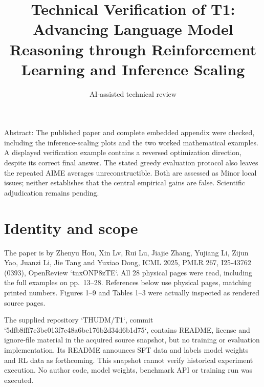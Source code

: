 \documentclass[10pt]{article}
\title{Technical Verification of T1: Advancing Language Model Reasoning through Reinforcement Learning and Inference Scaling}
\author{AI-assisted technical review}
\date{}
\begin{document}
\maketitle
Abstract: The published paper and complete embedded appendix were checked, including the inference-scaling plots and the two worked mathematical examples. A displayed verification example contains a reversed optimization direction, despite its correct final answer. The stated greedy evaluation protocol also leaves the repeated AIME averages unreconstructible. Both are assessed as Minor local issues; neither establishes that the central empirical gains are false. Scientific adjudication remains pending.\par
\section*{Identity and scope}
The paper is by Zhenyu Hou, Xin Lv, Rui Lu, Jiajie Zhang, Yujiang Li, Zijun Yao, Juanzi Li, Jie Tang and Yuxiao Dong, ICML 2025, PMLR 267, I25-43762 (0393), OpenReview `tnxONP8zTE`. All 28 physical pages were read, including the full examples on pp. 13–28. References below use physical pages, matching printed numbers. Figures 1–9 and Tables 1–3 were actually inspected as rendered source pages.\par
The supplied repository `THUDM/T1`, commit `5dfb8fff7e3bc013f7c48a6be176b2d34d6b1d75`, contains README, license and ignore-file material in the acquired source snapshot, but no training or evaluation implementation. Its README announces SFT data and labels model weights and RL data as forthcoming. This snapshot cannot verify historical experiment execution. No author code, model weights, benchmark API or training run was executed.\par
\end{document}
